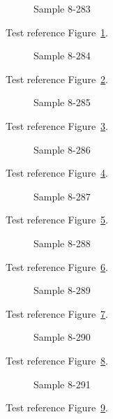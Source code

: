 \begin{figure}[tbhp]
\caption{Sample 8-283}
\label{fig:sample-8-283}
\end{figure}

Test reference Figure~\ref{fig:sample-8-283}.

\begin{figure}[tbhp]
\caption{Sample 8-284}
\label{fig:sample-8-284}
\end{figure}

Test reference Figure~\ref{fig:sample-8-284}.

\begin{figure}[tbhp]
\caption{Sample 8-285}
\label{fig:sample-8-285}
\end{figure}

Test reference Figure~\ref{fig:sample-8-285}.

\begin{figure}[tbhp]
\caption{Sample 8-286}
\label{fig:sample-8-286}
\end{figure}

Test reference Figure~\ref{fig:sample-8-286}.

\begin{figure}[tbhp]
\caption{Sample 8-287}
\label{fig:sample-8-287}
\end{figure}

Test reference Figure~\ref{fig:sample-8-287}.

\begin{figure}[tbhp]
\caption{Sample 8-288}
\label{fig:sample-8-288}
\end{figure}

Test reference Figure~\ref{fig:sample-8-288}.

\begin{figure}[tbhp]
\caption{Sample 8-289}
\label{fig:sample-8-289}
\end{figure}

Test reference Figure~\ref{fig:sample-8-289}.

\begin{figure}[tbhp]
\caption{Sample 8-290}
\label{fig:sample-8-290}
\end{figure}

Test reference Figure~\ref{fig:sample-8-290}.

\begin{figure}[tbhp]
\caption{Sample 8-291}
\label{fig:sample-8-291}
\end{figure}

Test reference Figure~\ref{fig:sample-8-291}.

